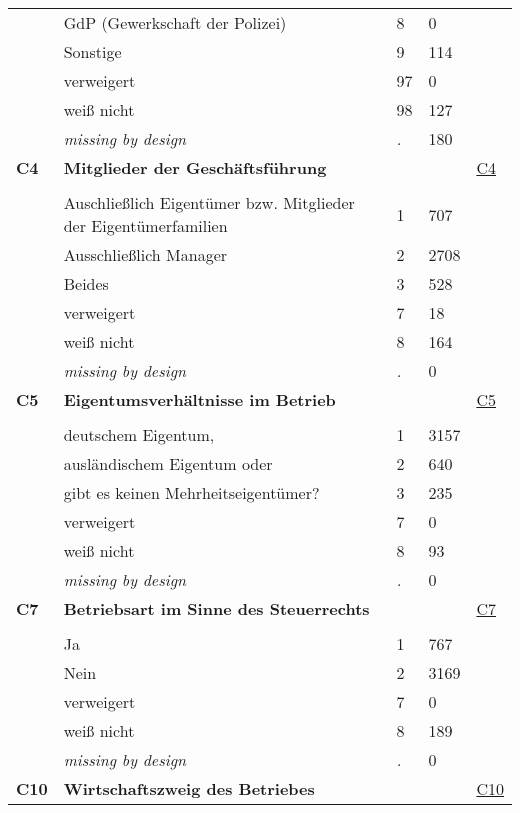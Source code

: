 \begin{longtable}{| L{2.65cm} | L{8cm} | C{1.5cm} | R{1.25cm} | C{2.25cm}  |}
   & GdP (Gewerkschaft der Polizei) & 8 & 0 &  \\ 
   & Sonstige & 9 & 114 &  \\ 
   & verweigert & 97 & 0 &  \\ 
   & weiß nicht & 98 & 127 &  \\ 
   & \textit{missing by design} & \textit{.} & 180 &  \\ 
   \midrule
\textbf{C4}\label{var:C4} & \textbf{Mitglieder der Geschäftsführung} &  &  & \hyperref[C4]{C4} \\ 
   &  &  &  &  \\ 
   & Auschließlich Eigentümer bzw. Mitglieder der Eigentümerfamilien & 1 & 707 &  \\ 
   & Ausschließlich Manager & 2 & 2708 &  \\ 
   & Beides & 3 & 528 &  \\ 
   & verweigert & 7 & 18 &  \\ 
   & weiß nicht & 8 & 164 &  \\ 
   & \textit{missing by design} & \textit{.} & 0 &  \\ 
   \midrule
\textbf{C5}\label{var:C5} & \textbf{Eigentumsverhältnisse im Betrieb} &  &  & \hyperref[C5]{C5} \\ 
   &  &  &  &  \\ 
   & deutschem Eigentum, & 1 & 3157 &  \\ 
   & ausländischem Eigentum oder & 2 & 640 &  \\ 
   & gibt es keinen Mehrheitseigentümer? & 3 & 235 &  \\ 
   & verweigert & 7 & 0 &  \\ 
   & weiß nicht & 8 & 93 &  \\ 
   & \textit{missing by design} & \textit{.} & 0 &  \\ 
   \midrule
\textbf{C7}\label{var:C7} & \textbf{Betriebsart im Sinne des Steuerrechts} &  &  & \hyperref[C7]{C7} \\ 
   &  &  &  &  \\ 
   & Ja & 1 & 767 &  \\ 
   & Nein & 2 & 3169 &  \\ 
   & verweigert & 7 & 0 &  \\ 
   & weiß nicht & 8 & 189 &  \\ 
   & \textit{missing by design} & \textit{.} & 0 &  \\ 
   \midrule
\textbf{C10}\label{var:C10} & \textbf{Wirtschaftszweig des Betriebes} &  &  & \hyperref[C10]{C10} \\ 

\end{longtable}
